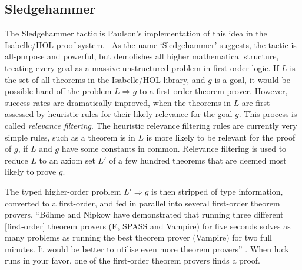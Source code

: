 \documentclass{llncs}
\begin{document}

\subsection{Sledgehammer}

The Sledgehammer tactic is Paulson's implementation of this idea in
the Isabelle/HOL proof system.~\cite{Paar}  As the name `Sledgehammer' suggests,
the tactic is all-purpose and powerful, but demolishes all higher
mathematical structure, treating every goal as a massive unstructured
problem in first-order logic.  If $L$ is the set of all theorems in
the Isabelle/HOL library, and $g$ is a goal, it would be possible hand
off the problem $L\Longrightarrow g$ to a first-order theorem
prover.  However, success rates are dramatically improved, when the
theorems in $L$ are first assessed by heuristic rules for their likely
relevance for the goal $g$.  This process is called {\it relevance
  filtering}.  The heuristic relevance filtering rules are currently
very simple rules, such as a theorem is in $L$ is more likely to be
relevant for the proof of $g$, if $L$ and $g$ have some constants in
common.  Relevance filtering is used to reduce $L$ to an axiom set $L'$ of a
few hundred theorems that are deemed most likely to prove $g$.

The typed higher-order problem $L'\Longrightarrow g$ is then stripped
of type information, converted to a first-order, and fed
 in parallel into several first-order theorem provers.  
 ``B\"ohme and Nipkow \cite{Boehme-Nipkow-IJCAR10} have demonstrated that
running three different [first-order] theorem provers (E, SPASS and
Vampire) for five seconds solves as many problems as running the
best theorem prover (Vampire) for two full minutes.  It would be
better to utilise even more theorem provers'' 
\cite{Paar}.
When luck runs in your favor, one of the first-order theorem provers finds
a proof.
\end{document}
